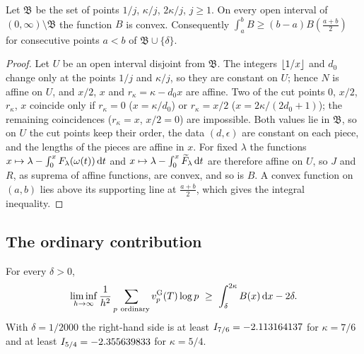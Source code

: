\begin{lemma}\label{lem:convexity}
Let $\mathfrak B$ be the set of points $1/j$, $\kappa/j$, $2\kappa/j$, $j\ge1$. On every open
interval of $(0,\infty)\setminus\mathfrak B$ the function $B$ is convex. Consequently
$\int_a^bB\ge(b-a)B(\frac{a+b}2)$ for consecutive points $a<b$ of $\mathfrak B\cup\{\delta\}$.
\end{lemma}

\begin{proof}
Let $U$ be an open interval disjoint from $\mathfrak B$. The integers $\left\lfloor 1/x\right\rfloor$ and $d_0$
change only at the points $1/j$ and $\kappa/j$, so they are constant on $U$; hence $N$ is
affine on $U$, and $x/2$, $x$ and $r_\kappa=\kappa-d_0x$ are affine. Two of the cut points $0$,
$x/2$, $r_\kappa$, $x$ coincide only if $r_\kappa=0$ ($x=\kappa/d_0$) or $r_\kappa=x/2$
($x=2\kappa/(2d_0+1)$); the remaining coincidences ($r_\kappa=x$, $x/2=0$) are impossible. Both
values lie in $\mathfrak B$, so on $U$ the cut points keep their order, the data $(d,\epsilon)$
are constant on each piece, and the lengths of the pieces are affine in $x$. For fixed $\lambda$ the
functions $x\mapsto\lambda-\int_0^xF_\lambda(\omega(t))\,\mathrm{d} t$ and
$x\mapsto\lambda-\int_0^x\widetilde F_\lambda\,\mathrm{d} t$ are therefore affine on $U$, so $J$ and $R$,
as suprema of affine functions, are convex, and so is $B$. A convex function on $(a,b)$ lies above
its supporting line at $\frac{a+b}2$, which gives the integral inequality.
\end{proof}

\subsection{The ordinary contribution}\label{subsec:ordinary-contribution}

\begin{theorem}\label{thm:ordinary}
For every $\delta>0$,
\[
  \liminf_{h\to\infty}\frac1{h^2}\sum_{p\ \mathrm{ordinary}}\vG p(T)\log p\ \ge\
  \int_\delta^{2\kappa}B(x)\diff x-2\delta .
\]
With $\delta=1/2000$ the right-hand side is at least $I_{7/6}=-2.113164137$ for
$\kappa=7/6$ and at least $I_{5/4}=-2.355639833$ for $\kappa=5/4$.
\end{theorem}

